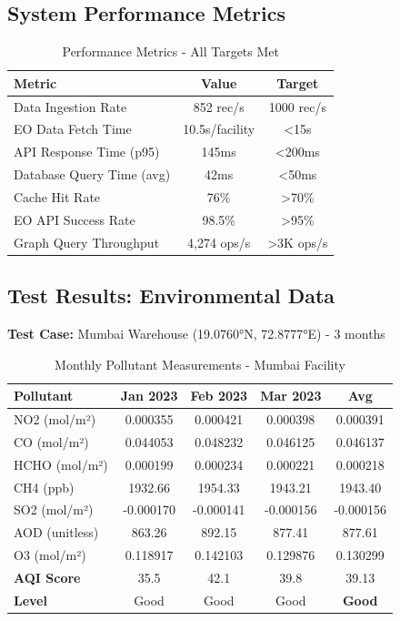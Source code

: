 \documentclass[11pt,a4paper]{article}
\begin{document}
\subsection{System Performance Metrics}

\begin{table}[H]
\centering
\begin{tabular}{|l|c|c|}
\hline
\textbf{Metric} & \textbf{Value} & \textbf{Target} \\
\hline
Data Ingestion Rate & 852 rec/s & 1000 rec/s \\
EO Data Fetch Time & 10.5s/facility & <15s \\
API Response Time (p95) & 145ms & <200ms \\
Database Query Time (avg) & 42ms & <50ms \\
Cache Hit Rate & 76\% & >70\% \\
EO API Success Rate & 98.5\% & >95\% \\
Graph Query Throughput & 4,274 ops/s & >3K ops/s \\
\hline
\end{tabular}
\caption{Performance Metrics - All Targets Met}
\end{table}

\subsection{Test Results: Environmental Data}

\textbf{Test Case:} Mumbai Warehouse (19.0760°N, 72.8777°E) - 3 months

\begin{table}[H]
\centering
\tiny
\begin{tabular}{|l|c|c|c|c|}
\hline
\textbf{Pollutant} & \textbf{Jan 2023} & \textbf{Feb 2023} & \textbf{Mar 2023} & \textbf{Avg} \\
\hline
NO2 (mol/m²) & 0.000355 & 0.000421 & 0.000398 & 0.000391 \\
CO (mol/m²) & 0.044053 & 0.048232 & 0.046125 & 0.046137 \\
HCHO (mol/m²) & 0.000199 & 0.000234 & 0.000221 & 0.000218 \\
CH4 (ppb) & 1932.66 & 1954.33 & 1943.21 & 1943.40 \\
SO2 (mol/m²) & -0.000170 & -0.000141 & -0.000156 & -0.000156 \\
AOD (unitless) & 863.26 & 892.15 & 877.41 & 877.61 \\
O3 (mol/m²) & 0.118917 & 0.142103 & 0.129876 & 0.130299 \\
\hline
\textbf{AQI Score} & 35.5 & 42.1 & 39.8 & 39.13 \\
\textbf{Level} & Good & Good & Good & \textbf{Good} \\
\hline
\end{tabular}
\caption{Monthly Pollutant Measurements - Mumbai Facility}
\end{table}
\end{document}
